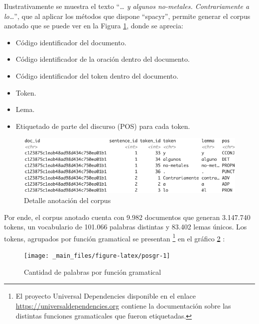 \documentclass[
  12pt,
  openany]{book}
\begin{document}
Ilustrativamente se muestra el texto ``\emph{\ldots{} y algunos no-metales. Contrariamente a lo\ldots{}}'', que al aplicar los métodos que dispone ``spacyr'', permite generar el corpus anotado que se puede ver en la Figura \ref{fig:corpusano}, donde se aprecia:

\begin{itemize}
\item
  Código identificador del documento.
\item
  Código identificador de la oración dentro del documento.
\item
  Código identificador del token dentro del documento.
\item
  Token.
\item
  Lema.
\item
  Etiquetado de parte del discurso (POS) para cada token.
\end{itemize}

\begin{figure}

{\centering \includegraphics[width=0.9\linewidth]{images/05-desarrollo/2_ciclo/nlp/corpusanotado2} 

}

\caption{Detalle anotación del corpus}\label{fig:corpusano}
\end{figure}

Por ende, el corpus anotado cuenta con 9.982 documentos que generan 3.147.740 tokens, un vocabulario de 101.066 palabras distintas y 83.402 lemas únicos. Los tokens, agrupados por función gramatical se presentan \footnote{El proyecto Universal Dependencies disponible en el enlace \url{https://universaldependencies.org} contiene la documentación sobre las distintas funciones gramaticales que fueron etiquetadas.} en el gráfico \ref{fig:posgr} :

\begin{figure}

{\centering \texttt{[image: \_main\_files/figure-latex/posgr-1]} 

}

\caption{Cantidad de palabras por función gramatical}\label{fig:posgr}
\end{figure}
\end{document}
